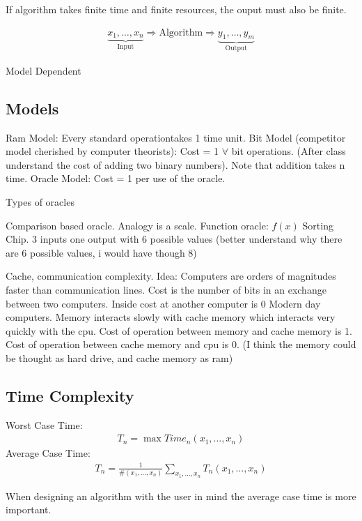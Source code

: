 \documentclass[class=scrartcl, crop=false]{standalone}
\begin{document}
If algorithm takes finite time and finite resources, the ouput must also be finite.

\begin{gather*}
  \underbrace{x_1, \dots, x_n}_{\text{Input}} \Rightarrow \text{Algorithm} \Rightarrow \underbrace{y_1, \dots, y_m}_{\text{Output}}
\end{gather*} 

Model Dependent

\subsection{Models}

\begin{enumerate}
  \ii
  Ram Model: Every standard operationtakes 1 time unit.
  \ii
  Bit Model (competitor model cherished by computer theorists): Cost = 1 $\forall$ bit operations. (After class understand the cost of adding two binary numbers). Note that addition takes n time.
  \ii
  Oracle Model: Cost = 1 per use of the oracle.
  \begin{example}
    Types of oracles
    \begin{enumerate}
      \ii
      Comparison based oracle. Analogy is a scale.
      \ii
      Function oracle: $f(x)$
      \ii
      Sorting Chip. 3 inputs one output with 6 possible values (better understand why there are 6 possible values, i would have though 8) 
    \end{enumerate} 
  \end{example} 
  \ii
  Cache, communication complexity. Idea: Computers are orders of magnitudes faster than communication lines. Cost is the number of bits in an exchange between two computers. Inside cost at another computer is 0
  \ii Modern day computers. Memory interacts slowly with cache memory which interacts very quickly with the cpu. Cost of operation between memory and cache memory is 1. Cost of operation between cache memory and cpu is 0. (I think the memory could be thought as hard drive, and cache memory as ram)
\end{enumerate} 

\subsection{Time Complexity}

\begin{enumerate}
  \ii
  Worst Case Time:
  \begin{gather*}
    T_n = \max Time_n(x_1, \dots, x_n)
  \end{gather*} 
  \ii
  Average Case Time: 
  \begin{gather*}
    T_n = \frac{1}{\#(x_1, \dots, x_n)}\sum_{x_1, \dots, x_n} T_n(x_1, \dots, x_n)
  \end{gather*} 
\end{enumerate} 
When designing an algorithm with the user in mind the average case time is more important.
\end{document}
